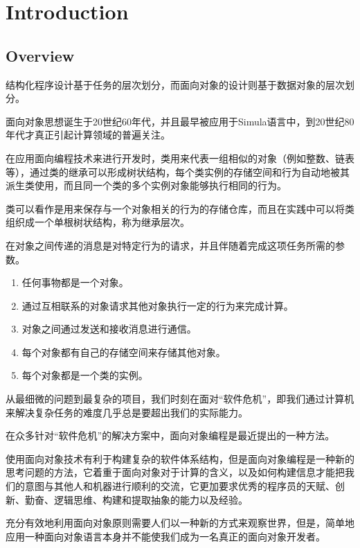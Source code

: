 \part{Introduction}


\chapter{Overview}

\begin{oopquote}
结构化程序设计基于任务的层次划分，而面向对象的设计则基于数据对象的层次划分。
\end{oopquote}

面向对象思想\cite{oop}诞生于20世纪60年代，并且最早被应用于Simula语言中，到20世纪80年代才真正引起计算领域的普遍关注。

在应用面向编程技术来进行开发时，类用来代表一组相似的对象（例如整数、链表等），通过类的继承可以形成树状结构，每个类实例的存储空间和行为自动地被其派生类使用，而且同一个类的多个实例对象能够执行相同的行为。

类可以看作是用来保存与一个对象相关的行为的存储仓库，而且在实践中可以将类组织成一个单根树状结构，称为继承层次。

在对象之间传递的消息是对特定行为的请求，并且伴随着完成这项任务所需的参数。

\begin{enumerate}
\item 任何事物都是一个对象。
\item 通过互相联系的对象请求其他对象执行一定的行为来完成计算。
\item 对象之间通过发送和接收消息进行通信。
\item 每个对象都有自己的存储空间来存储其他对象。
\item 每个对象都是一个类的实例。
\end{enumerate}


从最细微的问题到最复杂的项目，我们时刻在面对“软件危机”，即我们通过计算机来解决复杂任务的难度几乎总是要超出我们的实际能力。

在众多针对“软件危机”的解决方案中，面向对象编程是最近提出的一种方法。

使用面向对象技术有利于构建复杂的软件体系结构，但是面向对象编程是一种新的思考问题的方法，它着重于面向对象对于计算的含义，以及如何构建信息才能把我们的意图与其他人和机器进行顺利的交流，它更加要求优秀的程序员的天赋、创新、勤奋、逻辑思维、构建和提取抽象的能力以及经验。

充分有效地利用面向对象原则需要人们以一种新的方式来观察世界，但是，简单地应用一种面向对象语言本身并不能使我们成为一名真正的面向对象开发者。


